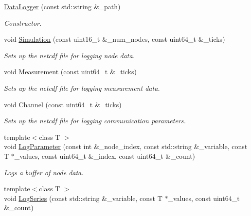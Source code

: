 \begin{DoxyCompactItemize}
\item 
\hyperlink{classosse_1_1collaborate_1_1_data_logger_a7f51038008c542dc5eb65575b30d9932}{Data\+Logger} (const std\+::string \&\+\_\+path)
\begin{DoxyCompactList}\small\item\em Constructor. \end{DoxyCompactList}\item 
void \hyperlink{classosse_1_1collaborate_1_1_data_logger_a8ac81bf337fd501a4dd1cefd7943b863}{Simulation} (const uint16\+\_\+t \&\+\_\+num\+\_\+nodes, const uint64\+\_\+t \&\+\_\+ticks)
\begin{DoxyCompactList}\small\item\em Sets up the netcdf file for logging node data. \end{DoxyCompactList}\item 
void \hyperlink{classosse_1_1collaborate_1_1_data_logger_a4bd4ae8e64651aa52952ed1f758f51a7}{Measurement} (const uint64\+\_\+t \&\+\_\+ticks)
\begin{DoxyCompactList}\small\item\em Sets up the netcdf file for logging measurement data. \end{DoxyCompactList}\item 
void \hyperlink{classosse_1_1collaborate_1_1_data_logger_a8a0d8ce2e134ad2f16850d3412cd68e2}{Channel} (const uint64\+\_\+t \&\+\_\+ticks)
\begin{DoxyCompactList}\small\item\em Sets up the netcdf file for logging communication parameters. \end{DoxyCompactList}\item 
{\footnotesize template$<$class T $>$ }\\void \hyperlink{classosse_1_1collaborate_1_1_data_logger_a2aa58d2cca89973b14894ad93b5ebb12}{Log\+Parameter} (const int \&\+\_\+node\+\_\+index, const std\+::string \&\+\_\+variable, const T $\ast$\+\_\+values, const uint64\+\_\+t \&\+\_\+index, const uint64\+\_\+t \&\+\_\+count)
\begin{DoxyCompactList}\small\item\em Logs a buffer of node data. \end{DoxyCompactList}\item 
{\footnotesize template$<$class T $>$ }\\void \hyperlink{classosse_1_1collaborate_1_1_data_logger_a40510224c3d75bb5d40fe68a3b9a278c}{Log\+Series} (const std\+::string \&\+\_\+variable, const T $\ast$\+\_\+values, const uint64\+\_\+t \&\+\_\+count)

\end{DoxyCompactItemize}
